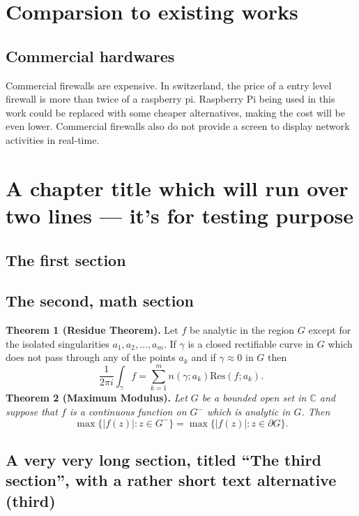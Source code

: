 \documentclass[mscthesis]{usiinfthesis}
\begin{document}
\chapter{Comparsion to existing works}
\section{Commercial hardwares}
Commercial firewalls are expensive. In switzerland, the price of a entry 
level firewall is more than twice of a raspberry pi. Raspberry Pi being
used in this work could be replaced with some cheaper alternatives, making 
the cost will be even lower. Commercial firewalls also do not provide a 
screen to display network activities in real-time.



\chapter[Short title]{A chapter title which will run over two lines --- it's for
  testing purpose}

\section{The first section}

 \section{The second, math section}

\textbf{Theorem 1 (Residue Theorem).}
Let $f$ be analytic in the region $G$ except for the isolated singularities $a_1,a_2,\ldots,a_m$. If $\gamma$ is a closed rectifiable curve in $G$ which does not pass through any of the points $a_k$ and if $\gamma\approx 0$ in $G$ then
\[
\frac{1}{2\pi i}\int_\gamma f = \sum_{k=1}^m n(\gamma;a_k) \text{Res}(f;a_k).
\]
\textbf{Theorem 2 (Maximum Modulus).}
\emph{Let $G$ be a bounded open set in $\mathbb{C}$ and suppose that $f$ is a continuous function on $G^-$ which is analytic in $G$. Then}
\[
\max\{|f(z)|:z\in G^-\}=\max \{|f(z)|:z\in \partial G \}.
\]

\section[third]{A very very long section, titled ``The third section'', with
  a rather  short text alternative (third)}
\end{document}
